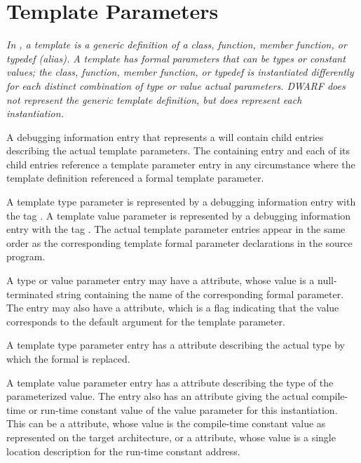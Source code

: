 \section{Template Parameters}
\label{chap:templateparameters}
\textit{In , a template is a generic definition 
of a class, function, member function, or typedef (alias).  
A template has formal parameters that
can be types or constant values; the class, function,
member function, or typedef is instantiated differently for each
distinct combination of type or value actual parameters.  DWARF does
not represent the generic template definition, but does represent each
instantiation.}

A debugging information entry that represents a 
will contain child entries describing the actual template parameters.
The containing entry and each of its child entries reference a template
parameter entry in any circumstance where the template definition
referenced a formal template parameter.

A template type parameter is represented by a debugging information
entry with the tag
\DWTAGtemplatetypeparameterTARG. 
A template value parameter is represented by a debugging information
entry with the tag
\DWTAGtemplatevalueparameterTARG.
The actual template parameter entries appear in the same order as the 
corresponding template formal parameter declarations in the 
source program.

A type or value parameter entry may have a \DWATname{} attribute, 
whose value is a
null-terminated string containing the name of the corresponding 
formal parameter. The entry may also have a 
\DWATdefaultvalue{} attribute, which is a flag indicating 
that the value corresponds to the default argument for the 
template parameter.

A
template type parameter entry has a
\DWATtype{} attribute
describing the actual type by which the formal is replaced.

A template value parameter entry has a \DWATtype{} attribute 
describing the type of the parameterized value.
The entry also has an attribute giving the 
actual compile-time or run-time constant value 
of the value parameter for this instantiation.
This can be a 
\DWATconstvalueDEFN{} attribute, 
whose value is the compile-time constant value 
as represented on the target architecture, or a 
\DWATlocation{} attribute, whose value is a 
single location description for the run-time constant address.

